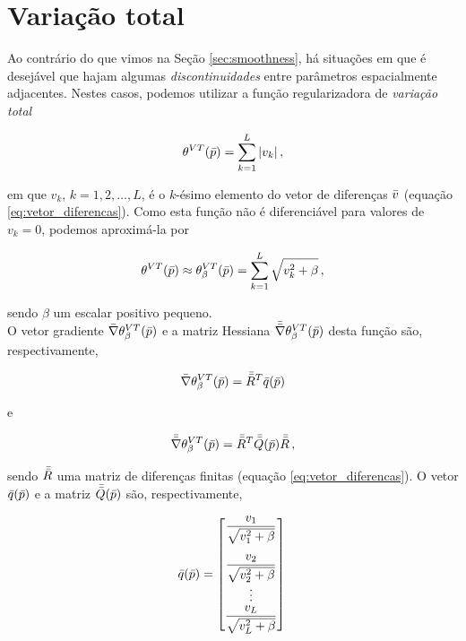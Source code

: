 \section{Variação total}

Ao contrário do que vimos na Seção \ref{sec:smoothness}, há situações em que é
desejável que hajam algumas {\it discontinuidades} entre parâmetros espacialmente
adjacentes. Nestes casos, podemos utilizar a função regularizadora de
{\it variação total}

\begin{equation}
\theta^{VT}(\bar{p}) = \sum\limits_{k=1}^L |v_k| \thinspace ,
\end{equation}

\noindent em que $v_k$, $k=1,2,\dotsc,L$, é o $k$-ésimo elemento do vetor de
diferenças $\bar{v}$ (equação \ref{eq:vetor_diferencas}).
Como esta função não é diferenciável para valores de $v_k = 0$, podemos
aproximá-la por

\begin{equation}
\theta^{VT}(\bar{p}) \approx \theta^{VT}_\beta(\bar{p}) =
    \sum\limits_{k=1}^L \sqrt{v_k^2 + \beta} \thinspace ,
\end{equation}

\noindent sendo $\beta$ um escalar positivo pequeno.
\\
\indent O vetor gradiente $\bar{\nabla}\theta^{VT}_\beta(\bar{p})$ e a matriz
Hessiana $\bar{\bar{\nabla}}\theta^{VT}_\beta(\bar{p})$ desta função
são, respectivamente, \citep{martins_etal2011}

\begin{equation}
\bar{\nabla}\theta^{VT}_\beta(\bar{p}) = \bar{\bar{R}}^T \bar{q}(\bar{p})
\label{eq:grad_tv}
\end{equation}

\noindent e

\begin{equation}
\bar{\bar{\nabla}}\theta^{VT}_\beta(\bar{p}) = \bar{\bar{R}}^T \bar{\bar{Q}}(\bar{p})\bar{\bar{R}}
\thinspace ,
\label{eq:hessian_tv}
\end{equation}

\noindent
sendo $\bar{\bar{R}}$ uma matriz de diferenças finitas
(equação \ref{eq:vetor_diferencas}).
O vetor $\bar{q}(\bar{p})$ e a matriz $\bar{\bar{Q}}(\bar{p})$ são, respectivamente,

\begin{equation}
\vect{q}(\vect{p}) =
    \begin{bmatrix}
    \dfrac{v_1}{\sqrt{v_1^2 + \beta}} \vspace{0.3cm}\\
    \dfrac{v_2}{\sqrt{v_2^2 + \beta}} \\
    \vdots \\ \dfrac{v_L}{\sqrt{v_L^2 + \beta}}
    \end{bmatrix} \thinspace
\end{equation}

